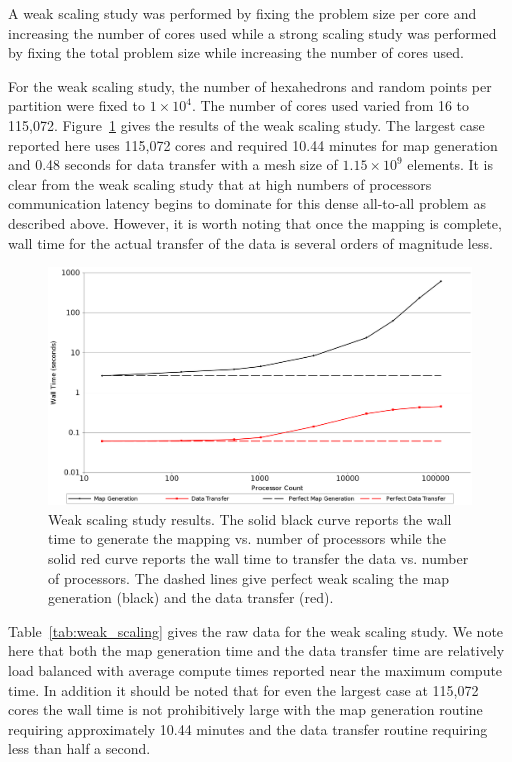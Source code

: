 \documentclass{mc2013}
\begin{document}
A weak scaling study was performed by fixing the problem size per core
and increasing the number of cores used while a strong scaling study
was performed by fixing the total problem size while increasing the
number of cores used.

\label{subsec:weak_scaling}
For the weak scaling study, the number of hexahedrons and random
points per partition were fixed to $1 \times 10^4$. The number of
cores used varied from 16 to 115,072. Figure~\ref{fig:weak_scaling}
gives the results of the weak scaling study. The largest case reported
here uses 115,072 cores and required 10.44 minutes for map generation
and 0.48 seconds for data transfer with a mesh size of $1.15 \times
10^9$ elements. It is clear from the weak scaling study that at high
numbers of processors communication latency begins to dominate for
this dense all-to-all problem as described above. However, it is worth
noting that once the mapping is complete, wall time for the actual
transfer of the data is several orders of magnitude less.

\begin{figure}[ht!]
  \centering \includegraphics[width=5.5in]{WeakScaling.png}
  \caption{Weak scaling study results. The solid black curve reports
    the wall time to generate the mapping vs. number of processors
    while the solid red curve reports the wall time to transfer the
    data vs. number of processors. The dashed lines give perfect weak
    scaling the map generation (black) and the data transfer (red).}
  \label{fig:weak_scaling}
\end{figure}

Table~\ref{tab:weak_scaling} gives the raw data for the weak scaling
study. We note here that both the map generation time and the data
transfer time are relatively load balanced with average compute times
reported near the maximum compute time. In addition it should be noted
that for even the largest case at 115,072 cores the wall time is not
prohibitively large with the map generation routine requiring
approximately 10.44 minutes and the data transfer routine requiring
less than half a second.
\end{document}

